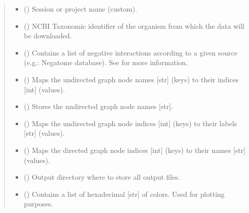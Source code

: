 \documentclass[letterpaper,10pt,english]{sphinxmanual}
\begin{document}
\begin{fulllineitems}
\begin{quote}
\begin{description}
\begin{itemize}
\item {} 
 () \textendash{} Session or project name (custom).

\item {} 
 () \textendash{} NCBI Taxonomic identifier of the organism from which the data
will be downloaded.

\item {} 
 () \textendash{} Contains a list of negative interactions according to a given
source (e.g.: Negatome database). See
{\hyperref[\detokenize{reference:pypath.main.PyPath.apply_negative}]{}} for more
information.

\item {} 
 () \textendash{} Maps the undirected graph node names {[}str{]} (keys) to their
indices {[}int{]} (values).

\item {} 
 () \textendash{} Stores the undirected graph node names {[}str{]}.

\item {} 
 () \textendash{} Maps the undirected graph node indices {[}int{]} (keys) to their
labels {[}str{]} (values).

\item {} 
 () \textendash{} Maps the directed graph node indices {[}int{]} (keys) to their names
{[}str{]} (values).

\item {} 
 () \textendash{} Output directory where to store all output files.

\item {} 
 () \textendash{} Contains a list of hexadecimal {[}str{]} of colors. Used for
plotting purposes.


\end{itemize}
\end{description}
\end{quote}
\end{fulllineitems}
\end{document}

